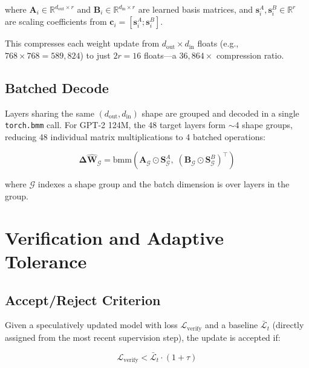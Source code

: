 \documentclass[conference]{IEEEtran}
\begin{document}
\noindent where $\mathbf{A}_i \in \mathbb{R}^{d_\mathrm{out} \times r}$ and $\mathbf{B}_i \in \mathbb{R}^{d_\mathrm{in} \times r}$ are learned basis matrices, and $\mathbf{s}_i^A, \mathbf{s}_i^B \in \mathbb{R}^r$ are scaling coefficients from $\mathbf{c}_i = [\mathbf{s}_i^A; \mathbf{s}_i^B]$.

This compresses each weight update from $d_\mathrm{out} \times d_\mathrm{in}$ floats (e.g., $768 \times 768 = 589{,}824$) to just $2r = 16$ floats---a $36{,}864\times$ compression ratio.

\subsection{Batched Decode}

Layers sharing the same $(d_\mathrm{out}, d_\mathrm{in})$ shape are grouped and decoded in a single \texttt{torch.bmm} call. For GPT-2 124M, the 48 target layers form $\sim$4 shape groups, reducing 48 individual matrix multiplications to 4 batched operations:

\begin{equation}
\boldsymbol{\Delta}\hat{\mathbf{W}}_{\mathcal{G}} = \mathrm{bmm}\!\left(\mathbf{A}_{\mathcal{G}} \odot \mathbf{S}_{\mathcal{G}}^A,\; \left(\mathbf{B}_{\mathcal{G}} \odot \mathbf{S}_{\mathcal{G}}^B\right)^\top\right)
\label{eq:batched_decode}
\end{equation}

\noindent where $\mathcal{G}$ indexes a shape group and the batch dimension is over layers in the group.

\section{Verification and Adaptive Tolerance}
\label{sec:verify}

\subsection{Accept/Reject Criterion}

Given a speculatively updated model with loss $\mathcal{L}_{\mathrm{verify}}$ and a baseline $\bar{\mathcal{L}}_t$ (directly assigned from the most recent supervision step), the update is accepted if:

\begin{equation}
\mathcal{L}_{\mathrm{verify}} < \bar{\mathcal{L}}_t \cdot (1 + \tau)
\label{eq:accept}
\end{equation}
\end{document}
